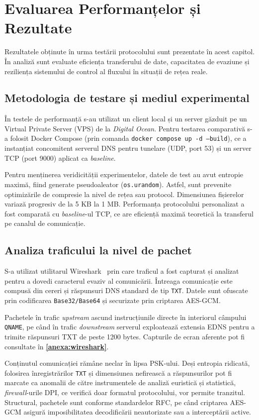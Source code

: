 \section{Evaluarea Performanțelor și Rezultate}
Rezultatele obținute în urma testării protocolului sunt prezentate în acest capitol. În analiză sunt evaluate eficiența transferului de date, capacitatea de evaziune și reziliența sistemului de control al fluxului în situații de rețea reale.

\subsection{Metodologia de testare și mediul experimental}
În testele de performanță s-au utilizat un client local și un server găzduit pe un Virtual Private Server (VPS) de la \textit{Digital Ocean}.
Pentru testarea comparativă s-a folosit Docker Compose (prin comanda \texttt{docker compose up -d --build}), ce a instanțiat concomitent serverul DNS pentru tunelare (UDP, port 53) și un server TCP (port 9000) aplicat ca \textit{baseline}.

Pentru menținerea veridicității experimentelor, datele de test au avut entropie maximă, fiind generate pseudoaleator (\texttt{os.urandom}). Astfel, sunt prevenite optimizările de compresie la nivel de rețea sau protocol. Dimensiunea fișierelor variază progresiv de la 5 KB la 1 MB. Performanța protocolului personalizat a fost comparată cu \textit{baseline}-ul TCP, ce are eficiență maximă teoretică la transferul pe canalul de comunicație.

\subsection{Analiza traficului la nivel de pachet}
S-a utilizat utilitarul Wireshark~\cite{wireshark} prin care traficul a fost capturat și analizat pentru a dovedi caracterul evaziv al comunicării. Întreaga comunicație este compusă din cereri și răspunsuri DNS standard de tip \texttt{TXT}. Datele sunt ofuscate prin codificarea \texttt{Base32/Base64} și securizate prin criptarea AES-GCM. 

Pachetele în trafic \textit{upstream} ascund instrucțiunile directe în interiorul câmpului \texttt{QNAME}, pe când în trafic \textit{downstream} serverul exploatează extensia EDNS pentru a trimite răspunsuri TXT de peste 1200 bytes. Capturile de ecran aferente pot fi consultate în \textbf{\ref{anexa:wireshark}}.

Conținutul comunicației rămâne neclar în lipsa PSK-ului. Deși entropia ridicată, folosirea înregistrărilor \texttt{TXT} și dimensiunea nefirească a răspunsurilor pot fi marcate ca anomalii de către instrumentele de analiză euristică și statistică, \textit{firewall}-urile DPI, ce verifică doar formatul protocolului, vor permite tranzitul. Structural, pachetele sunt conforme standardelor RFC, pe când criptarea AES-GCM asigură imposibilitatea decodificării neautorizate sau a interceptării active.

